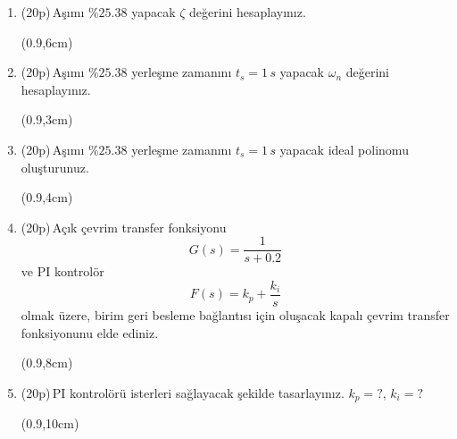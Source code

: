 \begin{enumerate}[\bfseries S1.]
    \item (20p)\,Aşımı $\%25.38$ yapacak $\zeta$ değerini hesaplayınız.
    \noindent
    \begin{center}
        \framebox(0.9\textwidth,6cm){}
    \end{center}
    \item (20p)\,Aşımı $\%25.38$ yerleşme zamanını $t_s=1\,s$ yapacak $\omega_n$ değerini hesaplayınız.
    \noindent
    \begin{center}
        \framebox(0.9\textwidth,3cm){}
    \end{center}
    \item (20p)\,Aşımı $\%25.38$ yerleşme zamanını $t_s=1\,s$ yapacak ideal polinomu oluşturunuz.
        \noindent
    \begin{center}
        \framebox(0.9\textwidth,4cm){}
    \end{center}
    \item (20p)\,Açık çevrim transfer fonksiyonu
    \begin{equation}
        G(s)=\frac{1}{s+0.2}
    \end{equation}
    ve PI kontrolör 
    \begin{equation}
        F(s)=k_p+\frac{k_i}{s}
    \end{equation}
    olmak üzere, birim geri besleme bağlantısı için oluşacak kapalı çevrim transfer fonksiyonunu elde ediniz.
        \noindent
    \begin{center}
        \framebox(0.9\textwidth,8cm){}
    \end{center}
    \item (20p)\,PI kontrolörü isterleri sağlayacak şekilde tasarlayınız. $k_p=?$, $k_i=?$ 
        \noindent
    \begin{center}
        \framebox(0.9\textwidth,10cm){}
    \end{center}

\end{enumerate}
